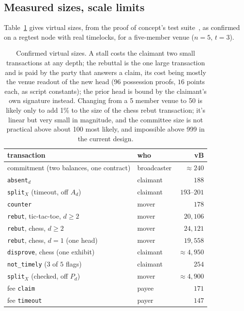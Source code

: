 \documentclass[11pt]{article}
\begin{document}
\subsection{Measured sizes, scale limits}
\label{sec:graph:sizes}

Table~\ref{tab:sizes} gives virtual sizes, from the proof of
concept's test suite~\cite{lngapcode}, as confirmed on a regtest
node with real timelocks, for a five-member venue ($n=5$, $t=3$).

\begin{table}[t]
\centering
\small
\begin{tabular}{llr}
\toprule
transaction & who & vB \\
\midrule
commitment (two balances, one contract) & broadcaster & $\approx 240$ \\
\texttt{absent}$_d$ & claimant & $188$ \\
\texttt{split}$_X$ (timeout, off $A_d$) & claimant & $193$--$201$ \\
\texttt{counter} & mover & $178$ \\
\texttt{rebut}, tic-tac-toe, $d \ge 2$ & mover & $20{,}106$ \\
\texttt{rebut}, chess, $d \ge 2$ & mover & $24{,}121$ \\
\texttt{rebut}, chess, $d = 1$ (one head) & mover & $19{,}558$ \\
\texttt{disprove}, chess (one exhibit) & claimant & $\approx 4{,}950$ \\
\texttt{not\_timely} ($3$ of $5$ flags) & claimant & $254$ \\
\texttt{split}$_X$ (checked, off $P_d$) & mover & $\approx 4{,}900$ \\
fee \texttt{claim} & payee & $171$ \\
fee \texttt{timeout} & payer & $147$ \\
\bottomrule
\end{tabular}
\caption{Confirmed virtual sizes. A stall costs the claimant two small
transactions at any depth; the rebuttal is the one large transaction
and is paid by the party that answers a claim, its cost being mostly
the venue readout of the new head ($96$ possession proofs, $16$ points
each, as script constants); the prior head is bound by the claimant's
own signature instead. Changing from a 5 member venue to 50 is likely only to add 1\% to the size of the chess rebut transaction; it's linear but very small in magnitude, and the committee size is not practical above about 100 most likely, and impossible above 999 in the current design.}
\label{tab:sizes}
\end{table}
\end{document}
